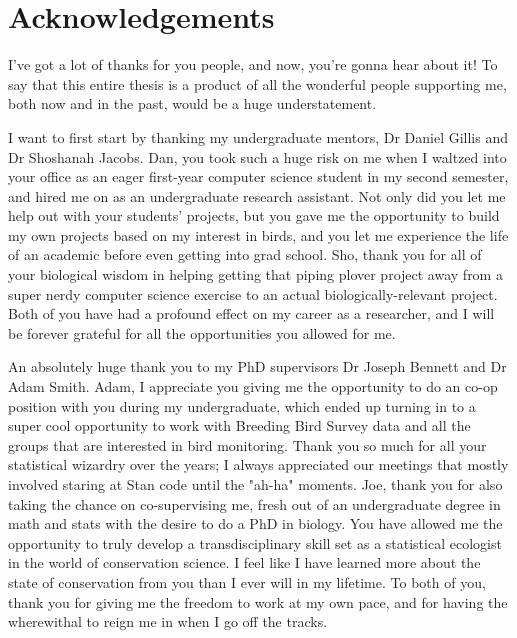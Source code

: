 \chapter*{Acknowledgements}


\par I've got a lot of thanks for you people, and now, you're gonna hear about it! 
To say that this entire thesis is a product of all the wonderful people supporting me, both now and in the past, would be a huge understatement.

\par I want to first start by thanking my undergraduate mentors, Dr Daniel Gillis and Dr Shoshanah Jacobs.
Dan, you took such a huge risk on me when I waltzed into your office as an eager first-year computer science student in my second semester, and hired me on as an undergraduate research assistant.
Not only did you let me help out with your students' projects, but you gave me the opportunity to build my own projects based on my interest in birds, and you let me experience the life of an academic before even getting into grad school.
Sho, thank you for all of your biological wisdom in helping getting that piping plover project away from a super nerdy computer science exercise to an actual biologically-relevant project. 
Both of you have had a profound effect on my career as a researcher, and I will be forever grateful for all the opportunities you allowed for me.

\par An absolutely huge thank you to my PhD supervisors Dr Joseph Bennett and Dr Adam Smith.
Adam, I appreciate you giving me the opportunity to do an co-op position with you during my undergraduate, which ended up turning in to a super cool opportunity to work with Breeding Bird Survey data and all the groups that are interested in bird monitoring.
Thank you so much for all your statistical wizardry over the years; I always appreciated our meetings that mostly involved staring at Stan code until the "ah-ha" moments.
Joe, thank you for also taking the chance on co-supervising me, fresh out of an undergraduate degree in math and stats with the desire to do a PhD in biology.
You have allowed me the opportunity to truly develop a transdisciplinary skill set as a statistical ecologist in the world of conservation science.
I feel like I have learned more about the state of conservation from you than I ever will in my lifetime.
To both of you, thank you for giving me the freedom to work at my own pace, and for having the wherewithal to reign me in when I go off the tracks.

